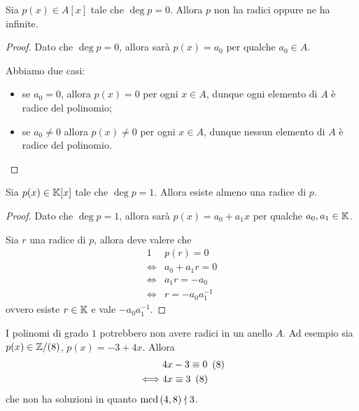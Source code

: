 \begin{proposition}
    Sia $p(x) \in A[x]$ tale che $\deg p = 0$. Allora $p$ non ha radici oppure ne ha infinite.
\end{proposition}
\begin{proof}
    Dato che $\deg p = 0$, allora sarà $p(x) = a_0$ per qualche $a_0 \in A$.

    Abbiamo due casi: \begin{itemize}
        \item se $a_0 = 0$, allora $p(x) = 0$ per ogni $x \in A$, dunque ogni elemento di $A$ è radice del polinomio;
        \item se $a_0 \neq 0$ allora $p(x) \neq 0$ per ogni $x \in A$, dunque nessun elemento di $A$ è radice del polinomio. \qedhere
    \end{itemize}
\end{proof}


\begin{proposition}
    Sia $p(x) \in \mathbb{K}[x]$ tale che $\deg p = 1$. Allora esiste almeno una radice di $p$.
\end{proposition}
\begin{proof}
    Dato che $\deg p = 1$, allora sarà $p(x) = a_0 + a_1x$ per qualche $a_0, a_1 \in \mathbb{K}$.

    Sia $r$ una radice di $p$, allora deve valere che \begin{alignat*}
        {1}
        &p(r) = 0 \\
        \iff &a_0 + a_1r = 0 \\
        \iff &a_1r = -a_0 \\
        \iff &r = -a_0a_1^{-1}
    \end{alignat*}
    ovvero esiste $r \in \mathbb{K}$ e vale $-a_0a_1^{-1}$.
\end{proof}

\begin{remark}
    I polinomi di grado $1$ potrebbero non avere radici in un anello $A$. Ad esempio sia $p(x) \in \mathbb{Z}/(8)$, $p(x) = -3 + 4x$. Allora \begin{alignat*}
        {1}
        &4x - 3\equiv 0 \ \left(8\right) \\
        \iff &4x \equiv 3 \ \left(8\right)
    \end{alignat*}
    che non ha soluzioni in quanto $\operatorname{mcd}\left(4, 8\right) \nmid 3$.
\end{remark}

